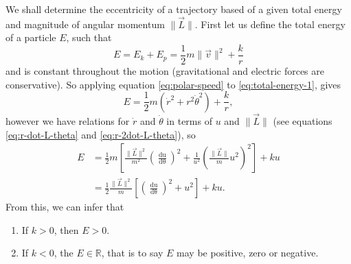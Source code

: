 We shall determine the eccentricity of a trajectory based of a given total energy and magnitude of angular momentum $\| \vec{L} \|$. First let us define the total energy of a particle $E$, such that
\begin{equation}
    \label{eq:total-energy-1}
    E = E_k + E_p = \frac{1}{2}m\| \vec{v} \|^2 + \frac{k}{r}
\end{equation}
and is constant throughout the motion (gravitational and electric forces are conservative). So applying equation \ref{eq:polar-speed} to \ref{eq:total-energy-1}, gives
\begin{equation}
    E = \frac{1}{2}m\left(\dot{r}^2 + r^2 \dot{\theta}^2\right) + \frac{k}{r},
\end{equation}
however we have relations for $\dot{r}$ and $\dot{\theta}$ in terms of $u$ and $\| \vec{L} \|$ (see equations \ref{eq:r-dot-L-theta} and \ref{eq:r-2dot-L-theta}), so
\begin{align}
    E &= \frac{1}{2} m \left[\frac{\| \vec{L}\|^2}{m^2} \left(\frac{\mathop{\mathrm{d}u}}{\mathop{\mathrm{d}\theta}}\right)^2 + \frac{1}{u^2} \left(\frac{\| \vec{L} \|}{m}u^2\right)^2\right] + ku \\
    &= \frac{1}{2}\frac{\| \vec{L} \|^2}{m} \left[\left(\frac{\mathop{\mathrm{d}u}}{\mathop{\mathrm{d}\theta}}\right)^2 + u^2\right] + ku.
\end{align}
From this, we can infer that
\begin{enumerate}
    \item If $k > 0$, then $E > 0$.
    \item If $k < 0$, the $E \in \mathbb{R}$, that is to say $E$ may be positive, zero or negative.
\end{enumerate}

